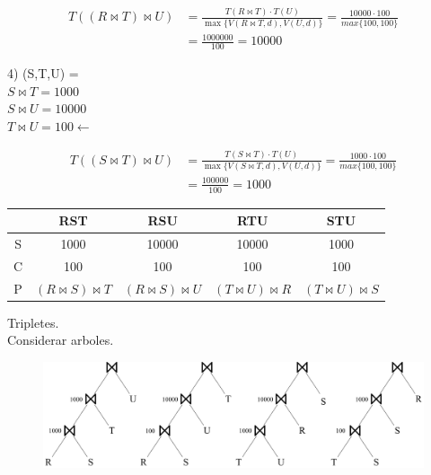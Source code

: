 \documentclass{templateNote}
\begin{document}
\begin{enumerate}
\begin{enumerate}[label=\alph*)]
                \begin{align*}
                    T((R \Join T) \Join U) &= \frac{T(R \Join T)\cdot T(U)}{\max\{V(R \Join T,d),V(U,d)\}} = \frac{10000\cdot100}{max\{100,100\}} \\ 
                    &= \frac{1000000}{100} = 10000
                \end{align*}

                4) (S,T,U) = \\
                \hspace*{0.25cm}$S \Join T = 1000$ \\
                \hspace*{0.25cm}$S \Join U = 10000$ \\
                \hspace*{0.25cm}$T \Join U = 100 \leftarrow$

                \begin{align*}
                    T((S \Join T) \Join U) &= \frac{T(S \Join T)\cdot T(U)}{\max\{V(S \Join T,d),V(U,d)\}} = \frac{1000\cdot100}{max\{100,100\}} \\ 
                    &= \frac{100000}{100} = 1000
                \end{align*}

                \begin{tabular}{|c|c|c|c|c|}
                    \hline
                    & RST & RSU & RTU & STU \\
                    \hline
                    S & 1000 & 10000 & 10000 & 1000 \\
                    \hline
                    C & 100 & 100 & 100 & 100  \\
                    \hline
                    P & $(R \Join S) \Join T$ & $(R \Join S) \Join U$ & $(T \Join U) \Join R$ & $(T \Join U) \Join S$ \\
                    \hline
                \end{tabular}
                
                \noindent Tripletes. \\Considerar arboles. \\

                \begin{figure}[H]
                    \centering
                    \includegraphics[width=\textwidth]{img/img1.png}
                \end{figure}
                

\end{enumerate}
\end{enumerate}
\end{document}
